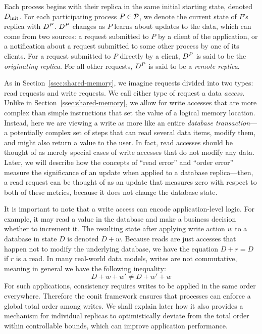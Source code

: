 \documentclass[]             %
{NASA}                       %
\theoremstyle{definition}
\begin{document}
Each process begins with their replica in the same initial starting
state, denoted $D_\textrm{init}$. For each participating process
$P \in \mathcal{P}$, we denote the current state of $P$'s replica with
$D^{P}$. $D^{P}$ changes as $P$ learns about updates to the data, which
can come from two sources: a request submitted to $P$ by a client of
the application, or a notification about a request submitted to some
other process by one of its clients. For a request submitted to $P$
directly by a client, $D^{P}$ is said to be the \emph{originating
  replica}. For all other requests, $D^{P}$ is said to be a \emph{remote
  replica}.

As in Section~\ref{ssec:shared-memory}, we imagine requests divided
into two types: read requests and write requests. We call either type
of request a data \emph{access}. Unlike in
Section~\ref{ssec:shared-memory}, we allow for write accesses that are
more complex than simple instructions that set the value of a logical
memory location. Instead, here we are viewing a write as more like an
entire \emph{database transaction}---a potentially complex set of
steps that can read several data items, modify them, and might also
return a value to the user. In fact, read accesses should be thought
of as merely special cases of write accesses that do not modify any
data. Later, we will describe how the concepts of ``read error'' and ``order error'' measure the significance of an update when applied to a database replica---then, a read request can be thought of as an update that measures zero with respect to both of these metrics, because it does not change the database state.

It is important to note that a write access can encode
application-level logic. For example, it may read a value in the
database and make a business decision whether to increment it. The
resulting state after applying write action $w$ to a database in state
$D$ is denoted $D + w$. Because reads are just accesses that happen
not to modify the underlying database, we have the equation
$D + r = D$ if $r$ is a read. In many real-world data models, writes
are not commutative, meaning in general we have the following
inequality:
\begin{equation}
  D + w + w' \neq D + w' + w \label{eq:conit-non-commutative}
\end{equation}
For such applications, consistency requires writes to be applied in
the same order everywhere. Therefore the conit framework ensures that
processes can enforce a global total order among writes. We shall
explain later how it also provides a mechanism for individual replicas
to optimistically deviate from the total order within controllable
bounds, which can improve application performance.
\end{document}
